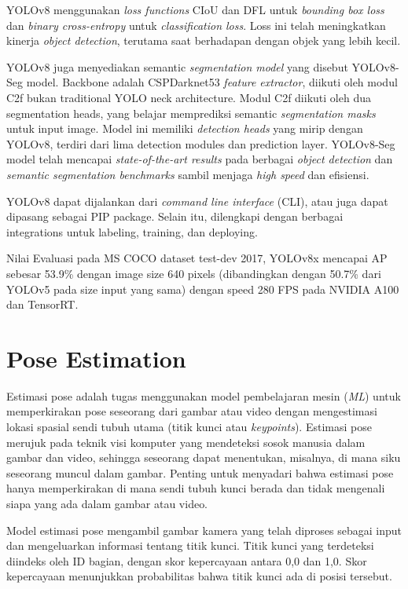YOLOv8 menggunakan \emph{loss functions} CIoU dan DFL untuk \emph{bounding box loss} dan \emph{binary cross-entropy} untuk \emph{classification loss}. Loss ini telah meningkatkan kinerja \emph{object detection}, terutama saat berhadapan dengan objek yang lebih kecil.

YOLOv8 juga menyediakan semantic \emph{segmentation model} yang disebut YOLOv8-Seg model. Backbone adalah CSPDarknet53 \emph{feature extractor}, diikuti oleh modul C2f bukan traditional YOLO neck architecture. Modul C2f diikuti oleh dua segmentation heads, yang belajar memprediksi semantic \emph{segmentation masks} untuk input image. Model ini memiliki \emph{detection heads} yang mirip dengan YOLOv8, terdiri dari lima detection modules dan prediction layer. YOLOv8-Seg model telah mencapai \emph{state-of-the-art results} pada berbagai \emph{object detection} dan \emph{semantic segmentation benchmarks} sambil menjaga \emph{high speed} dan efisiensi.

YOLOv8 dapat dijalankan dari \emph{command line interface} (CLI), atau juga dapat dipasang sebagai PIP package. Selain itu, dilengkapi dengan berbagai integrations untuk labeling, training, dan deploying.

Nilai Evaluasi pada MS COCO dataset test-dev 2017, YOLOv8x mencapai AP sebesar 53.9\% dengan image size 640 pixels (dibandingkan dengan 50.7\% dari YOLOv5 pada size input yang sama) dengan speed 280 FPS pada NVIDIA A100 dan TensorRT.

\section{Pose Estimation}
Estimasi pose adalah tugas menggunakan model pembelajaran mesin (\emph{ML}) untuk memperkirakan pose seseorang dari gambar atau video dengan mengestimasi lokasi spasial sendi tubuh utama (titik kunci atau \emph{keypoints}). Estimasi pose merujuk pada teknik visi komputer yang mendeteksi sosok manusia dalam gambar dan video, sehingga seseorang dapat menentukan, misalnya, di mana siku seseorang muncul dalam gambar. Penting untuk menyadari bahwa estimasi pose hanya memperkirakan di mana sendi tubuh kunci berada dan tidak mengenali siapa yang ada dalam gambar atau video.\parencite{tensorflow2015-whitepaper}

Model estimasi pose mengambil gambar kamera yang telah diproses sebagai input dan mengeluarkan informasi tentang titik kunci. Titik kunci yang terdeteksi diindeks oleh ID bagian, dengan skor kepercayaan antara 0,0 dan 1,0. Skor kepercayaan menunjukkan probabilitas bahwa titik kunci ada di posisi tersebut.\parencite{tensorflow2015-whitepaper}

